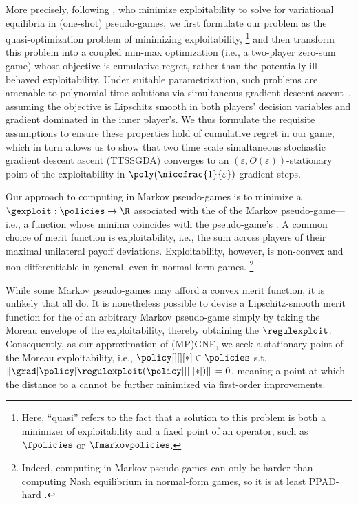 More precisely, following \citet{goktas2022exploit}, who minimize exploitability to solve for variational equilibria in (one-shot) pseudo-games, we first formulate our problem as the quasi-optimization problem of minimizing exploitability,%
\footnote{Here, ``quasi'' refers to the fact that a solution to this problem is both a minimizer of exploitability and a fixed point of an operator, such as $\fpolicies$ or $\fmarkovpolicies$.}
and then transform this problem into a coupled min-max optimization (i.e., a two-player zero-sum game) whose objective is cumulative regret, rather than the potentially ill-behaved exploitability.
Under suitable parametrization, such problems are amenable to polynomial-time solutions via simultaneous gradient descent ascent~\cite{arrow1958studies}, assuming the objective is Lipschitz smooth in both players' decision variables and gradient dominated in the inner player's.
We thus formulate the requisite assumptions to ensure these properties hold of cumulative regret in our game, which in turn allows us to show that two time scale simultaneous stochastic gradient descent ascent (TTSSGDA)
converges to an $(\varepsilon, O(\varepsilon))$-stationary point of the exploitability in $\poly(\nicefrac{1}{\varepsilon})$ gradient steps.


Our approach to computing \MPGNE{} in Markov pseudo-games is to minimize a  $\gexploit: \policies \to \R$ associated with the \MPGNE{} of the Markov pseudo-game---i.e., a function whose minima coincides with the pseudo-game's \MPGNE.
A common choice of merit function is exploitability, i.e., the sum across players of their maximal unilateral payoff deviations.
Exploitability, however, is non-convex and non-differentiable in general, even in normal-form games.%
\footnote{Indeed, computing \MPGNE{} in Markov pseudo-games can only be harder than computing Nash equilibrium in normal-form games, so it is at least PPAD-hard \cite{chen2009settling, daskalakis2009complexity}.}

While some Markov pseudo-games may afford a convex merit function, it is unlikely that all do.
It is nonetheless possible to devise a Lipschitz-smooth merit function for the \MPGNE{} of an arbitrary Markov pseudo-game simply by taking the Moreau envelope \cite{moreau1965proximite} of the exploitability, thereby obtaining the  $\regulexploit$.
Consequently, as our approximation of (MP)GNE, we seek a stationary point of the Moreau exploitability, i.e., $\policy[][][*] \in \policies$ s.t. $\| \grad[\policy] \regulexploit (\policy[][][*]) \| \, = 0$, meaning a point at which the distance to a \MPGNE{} cannot be further minimized via first-order improvements.

